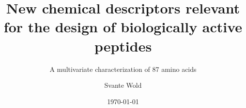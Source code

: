 \documentclass{article}
\begin{document}
\author{Svante Wold}
\title{New chemical descriptors relevant for the design of biologically active peptides}
\subtitle{A multivariate characterization of 87 amino acids}
\date{\today}

\maketitle
\end{document}
